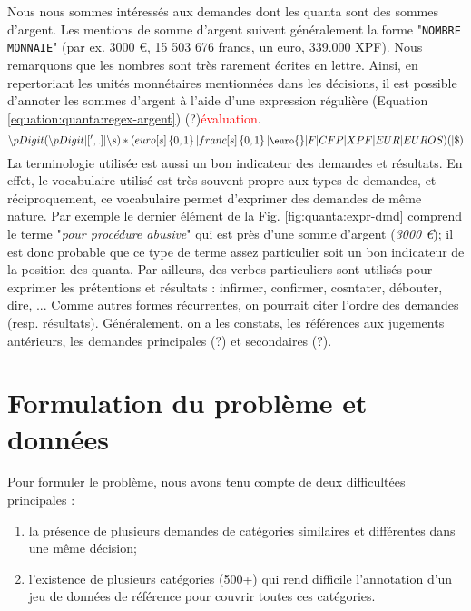 Nous nous sommes intéressés aux demandes dont les quanta sont des sommes d'argent. Les mentions de somme d'argent suivent généralement la forme "\verb=NOMBRE MONNAIE=" (par ex. 3000 \euro{}, 15 503 676 francs, un euro, 339.000 XPF). Nous remarquons que les nombres sont très rarement écrites en lettre. Ainsi, en repertoriant les unités monnétaires mentionnées dans les décisions, il est possible d'annoter les sommes d'argent à l'aide d'une expression régulière (Equation \ref{equation:quanta:regex-argent}) (?)\textcolor{red}{évaluation}.
\begin{equation} \small
    \backslash p{Digit}(\backslash p{Digit}|[',.]|\backslash s)*(euro[s]\left\{0,1\right\}|franc[s]\left\{0,1\right\}|\euro{}|F|CFP|XPF|EUR|EUROS)( |\$)\label{equation:quanta:regex-argent}
\end{equation}
La terminologie utilisée est aussi un bon indicateur des demandes et résultats. En effet, le vocabulaire utilisé est très souvent propre aux types de demandes, et réciproquement, ce vocabulaire permet d'exprimer des demandes de même nature. Par exemple le dernier élément de la Fig. \ref{fig:quanta:expr-dmd} comprend le terme "\textit{pour procédure abusive}" qui est près d'une somme d'argent (\textit{3000 \euro{}}); il est donc probable que ce type de terme assez particulier soit un bon indicateur de la position des quanta. Par ailleurs, des verbes particuliers sont utilisés pour exprimer les prétentions et résultats : infirmer, confirmer, cosntater, débouter, dire, ... Comme autres formes récurrentes, on pourrait citer l'ordre des demandes (resp. résultats). Généralement, on a les constats, les références aux jugements antérieurs, les demandes principales (?) et secondaires (?).

\section{Formulation du problème et données}
\label{sec:quanta:formulation}
Pour formuler le problème, nous avons tenu compte de deux difficultées principales :
\begin{enumerate}
    \item la présence de plusieurs demandes de catégories similaires et différentes dans une même décision;
    \item l'existence de plusieurs catégories (500+) qui rend difficile l'annotation d'un jeu de données de référence pour couvrir toutes ces catégories.
\end{enumerate}


